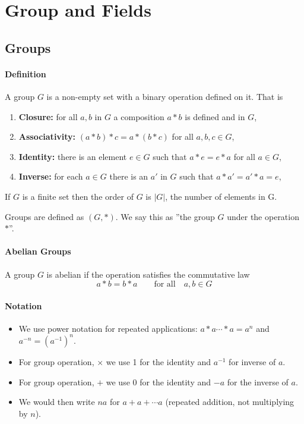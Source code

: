 \section{Group and Fields}
\subsection{Groups}

\paragraph{Definition} 
A group \(G\) is a non-empty set with a binary operation defined on it. That is 
\begin{enumerate}
    \item \textbf{Closure:} for all \(a,b\) in \(G\) a composition \(a * b\) is defined and in \(G\),
    \item \textbf{Associativity:} \((a * b) * c = a * (b * c)\) for all \(a,b,c \in G\),
    \item \textbf{Identity:} there is an element \(e\in G\) such that \(a * e = e * a\) for all \(a \in G\),
    \item \textbf{Inverse:} for each \(a \in G\) there is an \(a'\) in \(G\) such that \(a * a' = a' * a = e\),
\end{enumerate}
If \(G\) is a finite set then the order of \(G\) is \(|G|\), the number of elements in G.

Groups are defined as \((G, *)\). We say this as ''the group \(G\) under the operation \(*\)''.

\paragraph{Abelian Groups}
A group \(G\) is abelian if the operation satisfies the commutative law
\[a * b = b * a \qquad \text{for all} \quad a,b \in G\]

\paragraph{Notation}
\begin{itemize}
    \item We use power notation for repeated applications: \(a * a \cdots * a = a^n\) and \(a^{-n} = (a^{-1})^n\).
    \item For group operation, \(\times\) we use 1 for the identity and \(a^{-1}\) for inverse of \(a\).
    \item For group operation, \(+\) we use 0 for the identity and \(-a\) for the inverse of \(a\).
    \item We would then write \(na\) for \(a+a+\cdots a\) (repeated addition, not multiplying by \(n\)).
\end{itemize}

